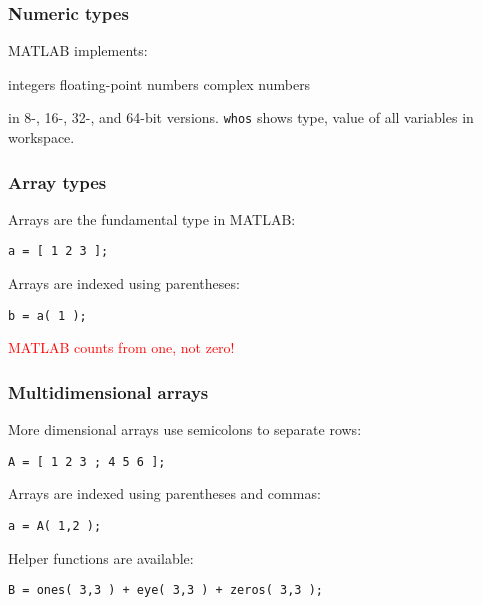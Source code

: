 \documentclass[11pt]{beamer}
\begin{document}
\begin{frame}[fragile]
  \frametitle{Numeric types}
  \Enlarge

  \begin{enumerate}
  \myitem  MATLAB implements:
    \begin{enumerate}
    \mysubitem  integers
    \mysubitem  floating-point numbers
    \mysubitem  complex numbers
    \end{enumerate}
  \myitem  in 8-, 16-, 32-, and 64-bit versions.
  \myitem  \texttt{whos} shows type, value of all variables in workspace.
  \end{enumerate}
\end{frame}

\begin{frame}[fragile]
  \frametitle{Array types}
  \Enlarge

  \begin{enumerate}
  \myitem  Arrays are the fundamental type in MATLAB:
  \end{enumerate}
  \begin{Verbatim}
a = [ 1 2 3 ];
  \end{Verbatim}
  \begin{enumerate}
  \myitem  Arrays are indexed using parentheses:
  \end{enumerate}
  \begin{Verbatim}
b = a( 1 );
  \end{Verbatim}
  \begin{enumerate}
  \myitem  \textcolor{red}{MATLAB counts from one, not zero!}
  \end{enumerate}
\end{frame}

\begin{frame}[fragile]
  \frametitle{Multidimensional arrays}
  \Enlarge

  \begin{enumerate}
  \myitem  More dimensional arrays use semicolons to separate rows:
  \end{enumerate}
  \begin{Verbatim}
A = [ 1 2 3 ; 4 5 6 ];
  \end{Verbatim}
  \begin{enumerate}
  \myitem  Arrays are indexed using parentheses and commas:
  \end{enumerate}
  \begin{Verbatim}
a = A( 1,2 );
  \end{Verbatim}
  \begin{enumerate}
  \myitem  Helper functions are available:
  \end{enumerate}
  \begin{Verbatim}
B = ones( 3,3 ) + eye( 3,3 ) + zeros( 3,3 );
  \end{Verbatim}
\end{frame}
\end{document}
